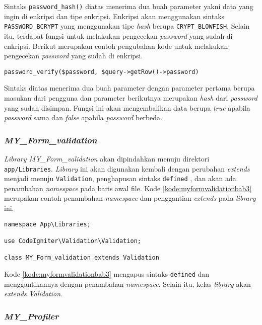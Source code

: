 Sintaks \texttt{password\_hash()} diatas menerima dua buah parameter yakni data yang ingin di enkripsi dan tipe enkripsi. Enkripsi akan menggunakan sintaks \texttt{PASSWORD\_BCRYPT} yang menggunakan tipe \textit{hash} berupa \texttt{CRYPT\_BLOWFISH}. Selain itu, terdapat fungsi untuk melakukan pengecekan \textit{password} yang sudah di enkripsi. Berikut merupakan contoh pengubahan kode untuk melakukan pengecekan \textit{password} yang sudah di enkripsi.
\begin{center}
\verb|password_verify($password, $query->getRow()->password)|
\end{center}
Sintaks diatas menerima dua buah parameter dengan parameter pertama berupa masukan dari pengguna dan parameter berikutnya merupakan \textit{hash} dari \textit{password} yang sudah disimpan. Fungsi ini akan mengembalikan data berupa \textit{true} apabila \textit{password} sama dan \textit{false} apabila \textit{password} berbeda.

\subsubsection{\textit{MY\_Form\_validation}}
\textit{Library MY\_Form\_validation} akan dipindahkan menuju direktori \texttt{app/Libraries}. \textit{Library} ini akan digunakan kembali dengan perubahan \textit{extends} menjadi menuju \texttt{Validation}, penghapusan sintaks \texttt{defined} , dan akan ada penambahan \textit{namespace} pada baris awal file. Kode \ref{kode:myformvalidationbab3} merupakan contoh penambahan \textit{namespace} dan penggantian \textit{extends} pada \textit{library} ini.
\begin{lstlisting}[caption=Contoh perubahan \textit{library MY\_Form\_validation} pada \textit{CodeIgniter 4}, label=kode:myformvalidationbab3]
namespace App\Libraries;

use CodeIgniter\Validation\Validation;

class MY_Form_validation extends Validation
\end{lstlisting}
Kode \ref{kode:myformvalidationbab3} mengapus sintaks \texttt{defined} dan menggantikannya dengan penambahan \textit{namespace}. Selain itu, kelas \textit{library} akan \textit{extends} \textit{Validation}.
\subsubsection{\textit{MY\_Profiler}}

